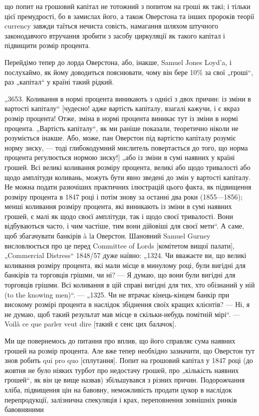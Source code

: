що попит на грошовий капітал не тотожний з попитом на гроші
як такі; і тільки цієї премудрості, бо в замислах його, а також
Оверстона та інших пророків теорії currency завжди таїться нечиста совість, намагання шляхом
штучного законодавчого втручання зробити з засобу циркуляції як такого капітал і підвищити
розмір процента.

Перейдімо тепер до лорда Оверстона, або, інакше, Samuel
Jones Loyd’a, і послухаймо, як йому доводиться пояснювати, чому
він бере 10\% за свої „гроші“, раз „капітал“ у країні такий
рідкий.

„3653. Коливання в нормі процента виникають з однієї з двох
причин: із зміни в вартості капіталу“ [чудесно! адже вартість
капіталу, взагалі кажучи, і є якраз розмір процента! Отже, зміна
в нормі процента виникає тут із зміни в нормі процента. „Вартість капіталу“, як ми раніше показали,
теоретично ніколи не
розуміється інакше. Або, може, пан Оверстон під вартістю
капіталу розуміє норму зиску, — тоді глибокодумний мислитель
повертається до того, що норма процента регулюється нормою
зиску!] „або із зміни в сумі наявних у країні грошей. Всі великі
коливання розміру процента, великі або щодо тривалості або
щодо амплітуди коливань, можуть бути явно зведені до змін
у вартості капіталу. Не можна подати разючіших практичних ілюстрацій цього факта, як підвищення
розміру процента в 1847 році
і потім знову за останні два роки (1855—1856); менші коливання
розміру процента, які виникають із зміни в сумі наявних грошей,
є малі як щодо своєї амплітуди, так і щодо своєї тривалості. Вони
відбуваються часто, і чим частіше, тим вони дійовіші для своєї
мети“. А саме, щоб збагачувати банкірів à lа Оверстон. Шановний Samuel Gurney висловлюється про це
перед Committee of
Lords [комітетом вищої палати], „Commercial Distress“ 1848/57 дуже
наївно: „1324. Чи вважаєте ви, що великі коливання розміру
процента, які мали місце в минулому році, були вигідні для
банкірів та торговців грішми, чи ні? — Я думаю, що вони були
вигідні для торговців грішми. Всі коливання в цій справі вигідні
для тих, хто обізнаний у ній (to the knowing men)“. — „1325. Чи не
втрачає кінець-кінцем банкір при високому розмірі процента
в наслідок збіднення своїх кращих клієнтів? — Ні, я не думаю,
щоб такий результат мав місце в скільки-небудь помітній мірі“. — Voilà ce que parler veut dire
[такий є сенс цих балачок].

Ми ще повернемось до питання про вплив, що його справляє
сума наявних грошей на розмір процента. Але вже тепер необхідно зазначити, що Оверстон тут знов
робить qui pro quo [сплутання]. Попит на грошовий капітал у 1847 році (до жовтня не
було ніяких турбот про недостачу грошей, про „кількість
наявних грошей“, як він це вище назвав) збільшувався з різних
причин. Подорожчання хліба, підвищення цін на бавовну, неможливість продати цукор в наслідок
перепродукції, залізнична
спекуляція і крах, переповнення зовнішніх ринків бавовняними
